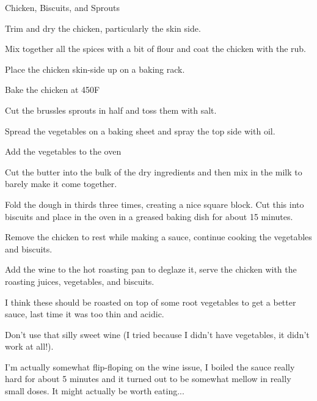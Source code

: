 \documentclass{recipe}
\begin{document}
\begin{recipe}{Chicken, Biscuits, and Sprouts}
  \begin{steps}
  \item Trim and dry the chicken, particularly the skin side.
  \item Mix together all the spices with a bit of flour and coat the
    chicken with the rub.
  \item Place the chicken skin-side up on a baking rack.
  \item Bake the chicken at 450\degree F
  \item Cut the brussles sprouts in half and toss them with salt.
  \item Spread the vegetables on a baking sheet and spray the top side
    with oil.
  \item Add the vegetables to the oven
  \item Cut the butter into the bulk of the dry ingredients and then
    mix in the milk to barely make it come together.
  \item Fold the dough in thirds three times, creating a nice square
    block.  Cut this into biscuits and place in the oven in a greased
    baking dish for about 15 minutes.
  \item Remove the chicken to rest while making a sauce, continue
    cooking the vegetables and biscuits.
  \item Add the wine to the hot roasting pan to deglaze it, serve the
    chicken with the roasting juices, vegetables, and biscuits.
  \end{steps}

  \begin{notes}
  \item I think these should be roasted on top of some root vegetables to
    get a better sauce, last time it was too thin and acidic.
  \item Don't use that silly sweet wine (I tried because I didn't have
    vegetables, it didn't work at all!).
  \item I'm actually somewhat flip-floping on the wine issue, I boiled
    the sauce really hard for about 5 minutes and it turned out to be
    somewhat mellow in really small doses.  It might actually be worth
    eating...
  \end{notes}
\end{recipe}
\end{document}
